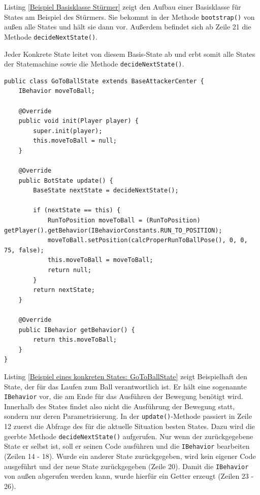 \documentclass[fontsize=12pt,a4paper,final]{scrartcl}[2003/01/01]
\begin{document}
Listing \ref{Beispiel Basisklasse Stürmer} zeigt den Aufbau einer Basisklasse für States am Beispiel des Stürmers. Sie bekommt in der Methode \lstinline$bootstrap()$ von außen alle States und hält sie dann vor. Außerdem befindet sich ab Zeile 21 die Methode \lstinline$decideNextState()$.

Jeder Konkrete State leitet von diesem Basis-State ab und erbt somit alle States der Statemachine sowie die Methode \lstinline$decideNextState()$.
\\

\begin{lstlisting}[caption=Beispiel eines konkreten States: GoToBallState, captionpos=b, label=Beispiel eines konkreten States: GoToBallState]
public class GoToBallState extends BaseAttackerCenter {
    IBehavior moveToBall;

    @Override
    public void init(Player player) {
        super.init(player);
        this.moveToBall = null;
    }

    @Override
    public BotState update() {
        BaseState nextState = decideNextState();

        if (nextState == this) {
            RunToPosition moveToBall = (RunToPosition) getPlayer().getBehavior(IBehaviorConstants.RUN_TO_POSITION);
            moveToBall.setPosition(calcProperRunToBallPose(), 0, 0, 75, false);
            this.moveToBall = moveToBall;
            return null;
        }
        return nextState;
    }

    @Override
    public IBehavior getBehavior() {
        return this.moveToBall;
    }
}
\end{lstlisting}

Listing \ref{Beispiel eines konkreten States: GoToBallState} zeigt Beispielhaft den State, der für das Laufen zum Ball verantwortlich ist. Er hält eine sogenannte \lstinline$IBehavior$ vor, die am Ende für das Ausführen der Bewegung benötigt wird. Innerhalb des States findet also nicht die Ausführung der Bewegung statt, sondern nur deren Parametrisierung. In der \lstinline$update()$-Methode passiert in Zeile 12 zuerst die Abfrage des für die aktuelle Situation besten States. Dazu wird die geerbte Methode \lstinline$decideNextState()$ aufgerufen. Nur wenn der zurückgegebene State er selbst ist, soll er seinen Code ausführen und die \lstinline$IBehavior$ bearbeiten (Zeilen 14 - 18). Wurde ein anderer State zurückgegeben, wird kein eigener Code ausgeführt und der neue State zurückgegeben (Zeile 20). Damit die \lstinline$IBehavior$ von außen abgerufen werden kann, wurde hierfür ein Getter erzeugt (Zeilen 23 - 26).
\end{document}
